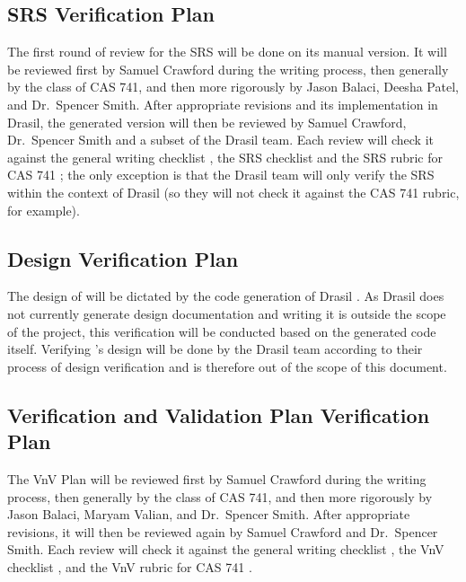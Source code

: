 \documentclass[12pt, titlepage]{article}
\begin{document}
\subsection{SRS Verification Plan} \label{sec_srs_verif_plan}

The first round of review for the SRS will be done on its manual version.
It will be reviewed first by Samuel Crawford during the writing process, then
generally by the class of CAS 741, and then more rigorously by Jason Balaci,
Deesha Patel, and Dr.~Spencer Smith. After appropriate revisions and its
implementation in Drasil, the generated version will then be reviewed by Samuel
Crawford, Dr.~Spencer Smith and a subset of the Drasil team. Each review will
check it against the general writing checklist \cite{writing_checklist}, the
SRS checklist \cite{srs_checklist} and the SRS rubric for CAS 741 ; the only exception is that the Drasil team
will only verify the SRS within the context of Drasil (so they will not check
it against the CAS 741 rubric, for example).

\subsection{Design Verification Plan} \label{sec_desVerPlan}

The design of \progname{} will be dictated by the code generation of Drasil
\cite{carette_drasil_2021}. As Drasil does not currently generate design
documentation \cite{carette_drasil_2021} and writing it is outside the scope of
the \progname{} project, this verification will be conducted
based on the generated code itself. Verifying \progname's
design will be done by the Drasil team according to their process of design
verification and is therefore out of the scope of this document.

\subsection{Verification and Validation Plan Verification Plan}
\label{sec_vnv_verif_plan}

The VnV Plan will be reviewed first by Samuel Crawford during the writing
process, then generally by the class of CAS 741, and then more rigorously by
Jason Balaci, Maryam Valian, and Dr.~Spencer Smith. After appropriate
revisions, it will then be reviewed again by Samuel Crawford and Dr.~Spencer
Smith. Each review will check it against the general writing checklist
\cite{writing_checklist}, the VnV checklist \cite{vnv_checklist},
and the VnV rubric for CAS 741 .
\end{document}
